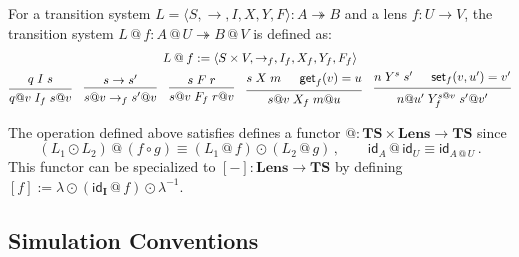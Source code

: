 \documentclass[acmsmall,screen,review,anonymous]{acmart}
\newcommand{\kw}[1]{\ensuremath{ \mathsf{#1} }}
\begin{document}
\begin{definition} \label{def:lift} %
For a transition system
$L = \langle S, {\rightarrow}, I, X, Y, F \rangle : A \twoheadrightarrow B$
and a lens $f : U \rightarrow V$,
the transition system
$L \mathbin@ f : A \mathbin@ U \twoheadrightarrow B \mathbin@ V$
is defined as:
\begin{gather*}
  L \mathbin@ f := \langle S \times V, {\rightarrow_f}, I_f, X_f, Y_f, F_f \rangle \\
 {\begin{prooftree}
    \hypo{q \mathrel{I} s}
    \infer1{q@v \mathrel{I_f} s@ v}
  \end{prooftree}}
  \quad
 {\begin{prooftree}
    \hypo{s \rightarrow s'}
    \infer1{s@v \rightarrow_f s'@v}
  \end{prooftree}}
  \quad
 {\begin{prooftree}
    \hypo{s \mathrel{F} r}
    \infer1{s@v \mathrel{F_f} r@v}
  \end{prooftree}}
  \quad
 {\begin{prooftree}
    \hypo{s \mathrel{X} m}
    \hypo{\kw{get}_f(v) = u}
    \infer2{s@v \mathrel{X_f} m@u}
  \end{prooftree}}
  \quad
 {\begin{prooftree}
    \hypo{n \mathrel{Y}^s s'}
    \hypo{\kw{set}_f(v, u') = v'}
    \infer2{n@u' \mathrel{Y^{s@v}_f} s'@v'}
  \end{prooftree}}
\end{gather*}
\end{definition}

\begin{theorem} %
The operation defined above satisfies
defines a functor
${@} : \mathbf{TS} \times \mathbf{Lens} \rightarrow \mathbf{TS}$
since
\[
  (L_1 \odot L_2) \mathbin@ (f \circ g) \equiv
    (L_1 \mathbin@ f) \odot (L_2 \mathbin@ g)
  \,,
  \qquad
  \kw{id}_A \mathbin@ \kw{id}_U \equiv \kw{id}_{A \mathbin@ U}
  \,.
\]
This functor can be specialized to
$[-] : \mathbf{Lens} \rightarrow \mathbf{TS}$
by defining
$[f] := \lambda \odot (\kw{id}_\mathbf{I} \mathbin@ f) \odot \lambda^{-1}$.
\end{theorem}


\subsection{Simulation Conventions} \label{sec:scomp:sc} %
\end{document}
